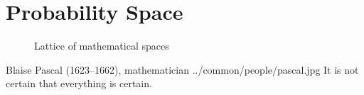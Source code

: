 \chapter{Probability Space}
\label{chp:prbspace}
\begin{figure}[th]
  \centering
  
  \caption{Lattice of mathematical spaces\label{fig:vector_spaces}}
\end{figure}%

\qboxnps
  {
    Blaise Pascal (1623--1662), mathematician
    \footnotemark
  }
  {../common/people/pascal.jpg}
  {It is not certain that everything is certain.}

